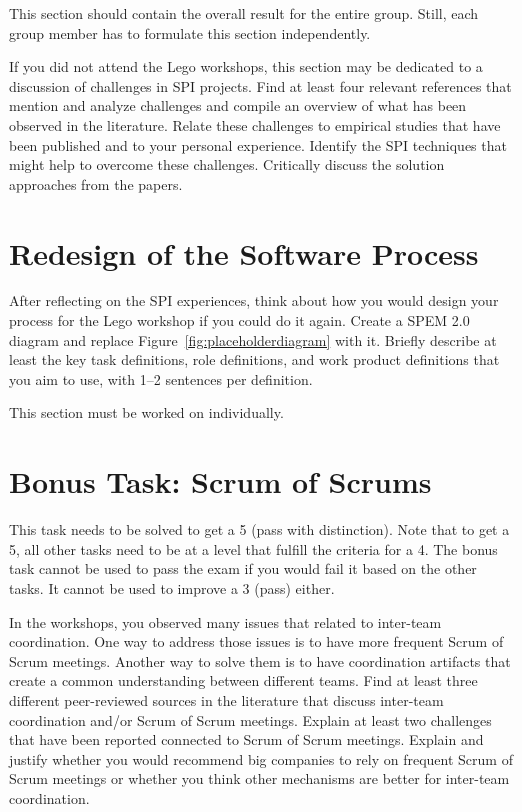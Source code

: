 \documentclass[conference]{IEEEtran}
\begin{document}
This section should contain the overall result for the entire group. Still, each group member has to formulate this section independently.

If you did not attend the Lego workshops, this section may be dedicated to a discussion of challenges in SPI projects. Find at least four relevant references that mention and analyze challenges and compile an overview of what has been observed in the literature. Relate these challenges to empirical studies that have been published and to your personal experience. Identify the SPI techniques that might help to overcome these challenges. Critically discuss the solution approaches from the papers.

\section{Redesign of the Software Process}
\label{sec:redesign}
After reflecting on the SPI experiences, think about how you would design your process for the Lego workshop if you could do it again.
Create a SPEM 2.0 diagram and replace Figure~\ref{fig:placeholderdiagram} with it.
Briefly describe at least the key task definitions, role definitions, and work product definitions that you aim to use, with 1--2 sentences per definition.

This section must be worked on individually.

\section{Bonus Task: Scrum of Scrums}
\label{sec:bonus_task}
This task needs to be solved to get a 5 (pass with distinction).
Note that to get a 5, all other tasks need to be at a level that fulfill the criteria for a 4.
The bonus task cannot be used to pass the exam if you would fail it based on the other tasks.
It cannot be used to improve a 3 (pass) either.

In the workshops, you observed many issues that related to inter-team coordination. One way to address those issues is to have more frequent Scrum of Scrum meetings. Another way to solve them is to have coordination artifacts that create a common understanding between different teams. Find at least three different peer-reviewed sources in the literature that discuss inter-team coordination and/or Scrum of Scrum meetings. Explain at least two challenges that have been reported connected to Scrum of Scrum meetings. Explain and justify whether you would recommend big companies to rely on frequent Scrum of Scrum meetings or whether you think other mechanisms are better for inter-team coordination. 
\end{document}
